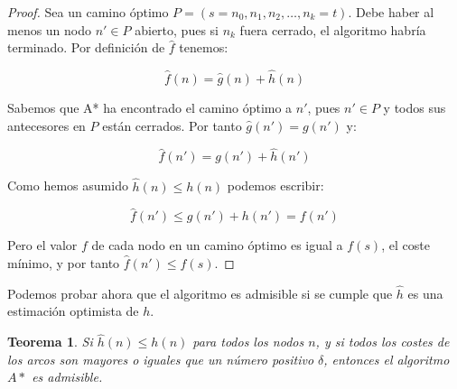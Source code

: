 \documentclass[a4paper,12pt]{article}
\newtheorem{thm}{Teorema}
\begin{document}
\begin{proof}
Sea un camino óptimo $P = (s=n_0, n_1, n_2, \dots, n_k = t)$. Debe haber al menos un nodo $n' \in P$ abierto, pues si $n_k$ fuera cerrado, el algoritmo habría terminado. Por definición de $\hat{f}$ tenemos:

$$\hat{f}(n) = \hat{g}(n) + \hat{h}(n)$$

\noindent Sabemos que A* ha encontrado el camino óptimo a $n'$, pues $n'\in P$ y todos sus antecesores en $P$ están cerrados. Por tanto $\hat{g}(n') = g(n')$ y:

$$\hat{f}(n') = g(n') + \hat{h}(n')$$

\noindent Como hemos asumido $\hat{h}(n) \leq h(n)$ podemos escribir:

$$\hat{f}(n') \leq g(n') + h(n') = f(n')$$

\noindent Pero el valor $f$ de cada nodo en un camino óptimo es igual a $f(s)$, el coste mínimo, y por tanto $\hat{f}(n') \leq f(s)$.
\end{proof}

Podemos probar ahora que el algoritmo es admisible si se cumple que $\hat{h}$ es una estimación optimista de $h$.

\begin{thm}\label{thm1}
Si $\hat{h}(n) \leq h(n)$ para todos los nodos $n$, y si todos los costes de los arcos son mayores o iguales que un número positivo $\delta$, entonces el algoritmo $A*$ es admisible.
\end{thm}
\end{document}
